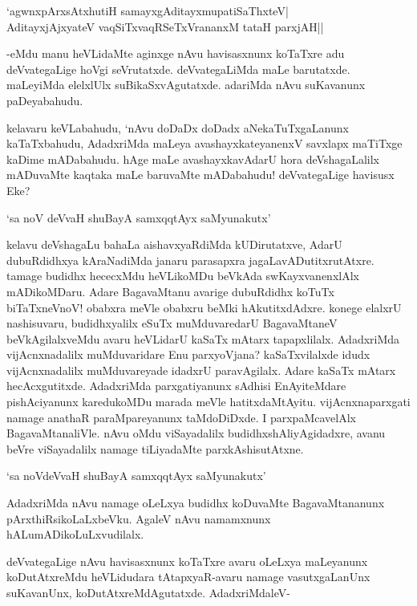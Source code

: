 \begin{shloka}
`agwnxpArxsAtxhutiH samayxgAditayxmupatiSaThxteV|\\
AditayxjAjxyateV vaqSiTxvaqRSeTxVrananxM tataH parxjAH||
\end{shloka}

-eMdu manu heVLidaMte aginxge nAvu havisasxnunx koTaTxre adu deVvategaLige hoVgi seVrutatxde. deVvategaLiMda maLe barutatxde. maLeyiMda elelxlUlx suBikaSxvAgutatxde. adariMda nAvu suKavanunx paDeyabahudu.

kelavaru keVLabahudu, `nAvu doDaDx doDadx aNekaTuTxgaLanunx kaTaTxbahudu, AdadxriMda maLeya avashayxkateyanenxV savxlapx maTiTxge kaDime mADabahudu. hAge maLe avashayxkavAdarU hora deVshagaLalilx mADuvaMte kaqtaka maLe baruvaMte mADabahudu! deVvategaLige havisusx Eke?

\begin{shloka}
`sa noV deVvaH shuBayA samxqqtAyx saMyunakutx'
\end{shloka}

kelavu deVshagaLu bahaLa aishavxyaRdiMda kUDirutatxve, AdarU dubuRdidhxya kAraNadiMda janaru parasapxra jagaLavADutitxrutAtxre. tamage budidhx hececxMdu heVLikoMDu beVkAda swKayxvanenxlAlx mADikoMDaru. Adare BagavaMtanu avarige dubuRdidhx koTuTx biTaTxneVnoV! obabxra meVle obabxru beMki hAkutitxdAdxre. konege elalxrU nashisuvaru, budidhxyalilx eSuTx muMduvaredarU BagavaMtaneV beVkAgilalxveMdu avaru heVLidarU kaSaTx mAtarx tapapxlilalx. AdadxriMda vijAcnxnadalilx muMduvaridare Enu parxyoVjana? kaSaTxvilalxde idudx vijAcnxnadalilx muMduvareyade idadxrU paravAgilalx. Adare kaSaTx mAtarx hecAcxgutitxde. AdadxriMda parxgatiyanunx sAdhisi EnAyiteMdare pishAciyanunx karedukoMDu marada meVle hatitxdaMtAyitu. vijAcnxnaparxgati namage anathaR paraMpareyanunx taMdoDiDxde. I parxpaMcavelAlx BagavaMtanaliVle. nAvu oMdu viSayadalilx budidhxshAliyAgidadxre, avanu beVre viSayadalilx namage tiLiyadaMte parxkAshisutAtxne.

\begin{shloka}
`sa noVdeVvaH shuBayA samxqqtAyx saMyunakutx'
\end{shloka} 

AdadxriMda nAvu namage oLeLxya budidhx koDuvaMte BagavaMtananunx pArxthiRsikoLaLxbeVku. AgaleV nAvu namamxnunx hALumADikoLuLxvudilalx.

deVvategaLige nAvu havisasxnunx koTaTxre avaru oLeLxya maLeyanunx koDutAtxreMdu heVLidudara tAtapxyaR-avaru namage vasutxgaLanUnx suKavanUnx,  koDutAtxreMdAgutatxde. AdadxriMdaleV-

